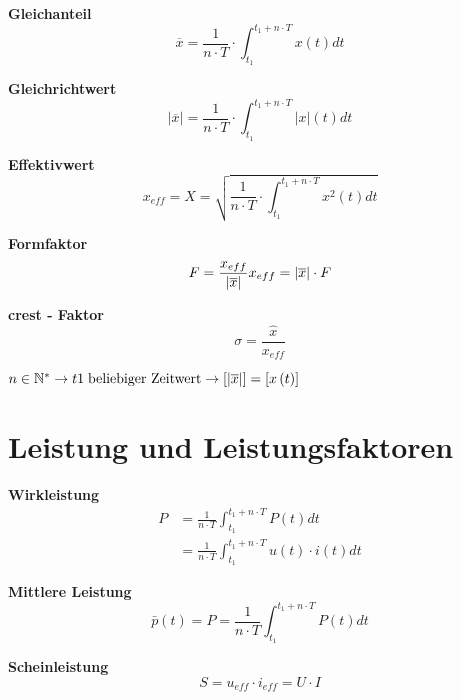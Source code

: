 \begin{multicols}{2}{}
\textbf{Gleichanteil}
\[ \overline{x} = \frac{1}{n \cdot T} \cdot \int_{t_{1}}^{t_{1} + n \cdot T} x \left( t \right) dt \]

\textbf{Gleichrichtwert}
\[ \left| \overline{x} \right| = \frac{1}{n \cdot T} \cdot 
\int_{t_{1}}^{t_{1} + n \cdot T} \left| x \right| \left( t \right) dt\]

\textbf{Effektivwert}
\[ x_{eff} = X = \sqrt{ \frac{1}{n \cdot T} \cdot \int_{t_{1}}^{t_{1} + n \cdot T} x^2 \left( t \right) dt} \]

\textbf{Formfaktor}
\[F = \frac{x_{eff}}{\left|\overline{x}\right|} \\ 
x_{eff} = \left|\overline{x}\right| \cdot F \]

\textbf{crest - Faktor}
\[ \sigma = \frac{\hat{x}}{x_{eff}} \]
\hfill
\end{multicols}

\begin{center}
\(n \in \mathbb{N}^* \rightarrow
t1 \; \text{beliebiger Zeitwert} \rightarrow
\left[|\overline{x} \right|] = \left[ x\left( t \right) \right] \) 
\end{center}

\section{Leistung und Leistungsfaktoren}
\begin{multicols}{2}{}
 
\textbf{Wirkleistung}
\begin{align*}
P &= \frac{1}{n \cdot T} \int_{t_{1}}^{t_{1} + n \cdot T} P \left( t \right) dt \\
  &= \frac{1}{n \cdot T} \int_{t_{1}}^{t_{1} + n \cdot T} u \left( t \right) \cdot i \left( t \right) dt
\end{align*}

\textbf{Mittlere Leistung}
\[\bar{p} \left(t\right) = P = \frac{1}{n \cdot T} \int_{t_{1}}^{t_{1} + n \cdot T} P \left( t \right) dt\]

\textbf{Scheinleistung}
\[ S = u_{eff} \cdot i_{eff} = U \cdot I\]
\end{multicols}

